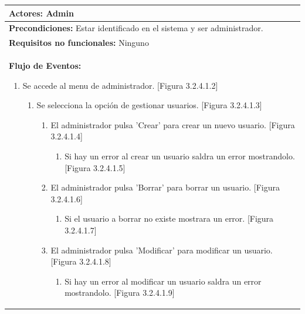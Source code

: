 ﻿\documentclass{report}
\begin{document}
\begin{center}
\begin{longtable}{|p{\linewidth}|}
                            \hline
                            \textbf{Actores:} Admin\\
                            \hline
                            \textbf{Precondiciones:} Estar identificado en el sistema y ser administrador.\\
                            \hline
                            \textbf{Requisitos no funcionales:} Ninguno\\
                            \hline
                            \textbf{Flujo de Eventos:}
                            \begin{enumerate}
                                \item Se accede al menu de administrador. [Figura 3.2.4.1.2]
                                \begin{enumerate}
                                    \item Se selecciona la opción de gestionar usuarios. [Figura 3.2.4.1.3]
                                    \begin{enumerate}
                                        \item El administrador pulsa 'Crear' para crear un nuevo usuario. [Figura 3.2.4.1.4]
                                        \begin{enumerate}
                                            \item Si hay un error al crear un usuario saldra un error mostrandolo. [Figura 3.2.4.1.5]
                                        \end{enumerate}
                                        \item El administrador pulsa 'Borrar' para borrar un usuario. [Figura 3.2.4.1.6]
                                        \begin{enumerate}
                                            \item Si el usuario a borrar no existe mostrara un error. [Figura 3.2.4.1.7]
                                        \end{enumerate}
                                        \item El administrador pulsa 'Modificar' para modificar un usuario. [Figura 3.2.4.1.8]
                                        \begin{enumerate}
                                            \item Si hay un error al modificar un usuario saldra un error mostrandolo. [Figura 3.2.4.1.9]
                                        \end{enumerate}

\end{enumerate}
\end{enumerate}
\end{enumerate}
\end{longtable}
\end{center}
\end{document}
